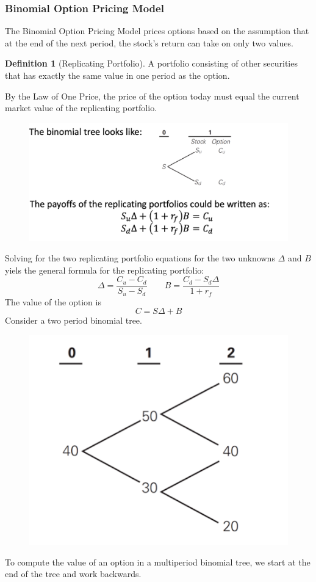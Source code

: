 \documentclass[11pt]{article}
\theoremstyle{definition}
\newtheorem*{definition}{Definition}
\begin{document}
\subsubsection{Binomial Option Pricing Model}
The Binomial Option Pricing Model prices options based on the assumption that at the end of the next period, the stock's return can take on only two values. 
\begin{definition}[Replicating Portfolio]
    A portfolio consisting of other securities that has exactly the same value in one period as the option.
\end{definition}
By the Law of One Price, the price of the option today must equal the current market value of the replicating portfolio.
\begin{figure}[h]
    \centering
    \includegraphics[scale=0.25]{Screenshot 2023-12-13 at 16.47.58.png}
\end{figure}
\newpage
Solving for the two replicating portfolio equations for the two unknowns $\Delta$ and $B$ yiels the general formula for the replicating portfolio:
\begin{equation*}
    \Delta = \frac{C_u - C_d}{S_u -S_d} \qquad B = \frac{C_d - S_d\Delta}{1 + r_f}
\end{equation*}
The value of the option is
\begin{equation*}
    C = S\Delta + B
\end{equation*}
Consider a two period binomial tree.
\begin{figure}[h]
    \centering
    \includegraphics[scale=0.3]{Screenshot 2023-12-13 at 16.52.30.png}
\end{figure}
To compute the value of an option in a multiperiod binomial tree, we start at the end of the tree and work backwards.
\end{document}
